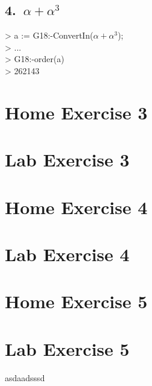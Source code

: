 \documentclass[12pt]{article}
\newenvironment{Courier}{\fontfamily{pcr}\selectfont}{\par}
\begin{document}
    \subsection*{4.\ \(\alpha+\alpha^3\)}

    \begin{Courier}
        \hspace*{10pt} > a := G18:-ConvertIn(\(\alpha + \alpha^3\));
        \\
        \hspace*{10pt} > ...
        \\
        \hspace*{10pt} > G18:-order(a)
        \\
        \hspace*{10pt} > 262143
        \end{Courier}


\section*{Home Exercise 3}
\section*{Lab Exercise 3}
\section*{Home Exercise 4}
\section*{Lab Exercise 4}
\section*{Home Exercise 5}
\section*{Lab Exercise 5}
asdaadsssd\cite{wiki:shiftregister}


\newpage


\end{document}
